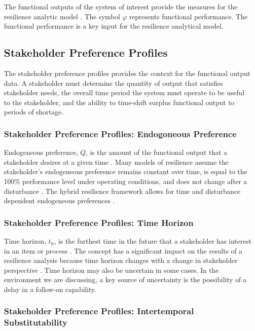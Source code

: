 The functional outputs of the system of interest provide the
measures for the resilience analytic model \cite{Ayyub2014}. The
symbol $\varphi$ represents functional performance. The functional
performance is a key input for the resilience analytical model.

\subsection{Stakeholder Preference Profiles}
The stakeholder preference profiles provides the context for the
functional output data. A stakeholder must determine the quantity of
output that satisfies stakeholder needs, the overall time period the
system must operate to be useful to the stakeholder, and the ability
to time-shift surplus functional output to periods of shortage.

\subsubsection{Stakeholder Preference Profiles: Endogoneous Preference}

Endogeneous preference, $Q$, is the amount of the functional output
that a stakeholder desires at a given time \cite{Black2013}.  Many
models of resilience assume the stakeholder's endogeneous preference
remains constant over time, is equal to the 100\% 
performance level under operating conditions, and does not change
after a disturbance \cite{Emanuel2017}. The hybrid resilience
framework allows for time and disturbance dependent endogeneous
preferences \cite{Emanuel2018}.

\subsubsection{Stakeholder Preference Profiles: Time Horizon}
Time horizon, $t_h$, is the furthest time in the future that a stakeholder 
has interest in an item or process \cite{Black2013}. The concept has a
significant impact on the results 
of a resilience analysis because time 
horizon changes with a change in stakeholder perspective
\cite{Emanuel2018}. Time horizon may also be uncertain in
some cases. In the environment we are discussing, a key source of
uncertainty is the possibility of a delay in a follow-on capability.

\subsubsection{Stakeholder Preference Profiles: Intertemporal
  Substitutability}

